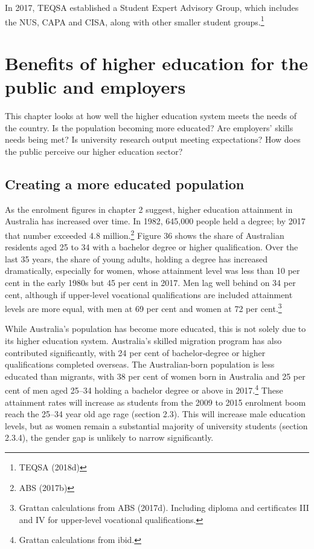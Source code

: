 \documentclass[]{book}
\begin{document}
In 2017, TEQSA established a Student Expert Advisory Group, which includes the NUS, CAPA and CISA, along with other smaller student groups.\footnote{TEQSA (2018d)}

\hypertarget{benefits-of-higher-education-for-the-public-and-employers}{%
\chapter{Benefits of higher education for the public and employers}\label{benefits-of-higher-education-for-the-public-and-employers}}

This chapter looks at how well the higher education system meets the needs of the country. Is the population becoming more educated? Are employers' skills needs being met? Is university research output meeting expectations? How does the public perceive our higher education sector?

\hypertarget{creating-a-more-educated-population}{%
\section{Creating a more educated population}\label{creating-a-more-educated-population}}

As the enrolment figures in chapter 2 suggest, higher education attainment in Australia has increased over time. In 1982, 645,000 people held a degree; by 2017 that number exceeded 4.8 million.\footnote{ABS (2017b)} Figure 36 shows the share of Australian residents aged 25 to 34 with a bachelor degree or higher qualification. Over the last 35 years, the share of young adults, holding a degree has increased dramatically, especially for women, whose attainment level was less than 10 per cent in the early 1980s but 45 per cent in 2017. Men lag well behind on 34 per cent, although if upper-level vocational qualifications are included attainment levels are more equal, with men at 69 per cent and women at 72 per cent.\footnote{Grattan calculations from ABS (2017d). Including diploma and certificates III and IV for upper-level vocational qualifications.}

While Australia's population has become more educated, this is not solely due to its higher education system. Australia's skilled migration program has also contributed significantly, with 24 per cent of bachelor-degree or higher qualifications completed overseas. The Australian-born population is less educated than migrants, with 38 per cent of women born in Australia and 25 per cent of men aged 25--34 holding a bachelor degree or above in 2017.\footnote{Grattan calculations from ibid.} These attainment rates will increase as students from the 2009 to 2015 enrolment boom reach the 25--34 year old age rage (section 2.3). This will increase male education levels, but as women remain a substantial majority of university students (section 2.3.4), the gender gap is unlikely to narrow significantly.
\end{document}
